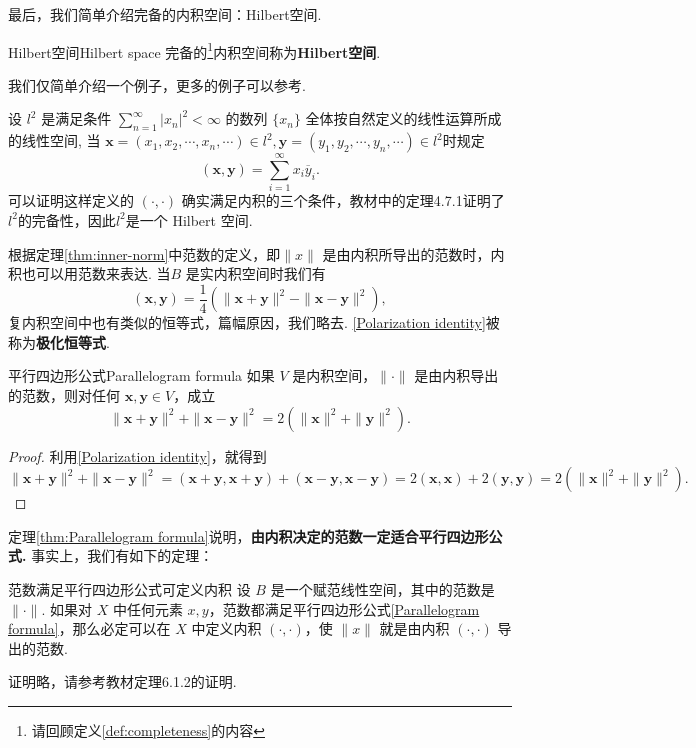 \documentclass[12pt, a4paper,newtx]{ctexart}
\begin{document}
最后，我们简单介绍完备的内积空间：Hilbert空间. 
\begin{definition}{Hilbert空间}{Hilbert space}
	完备的\footnote{请回顾定义\ref{def:completeness}的内容}内积空间称为\textbf{Hilbert空间}. 
\end{definition}
我们仅简单介绍一个例子，更多的例子可以参考\cite{5}. 
\begin{example}{}{}
	设 $l^2$ 是满足条件 $\displaystyle \sum_{n=1}^{\infty} |x_n|^2 < \infty$ 的数列 $\{x_n\}$ 全体按自然定义的线性运算所成的线性空间, 当
	$\bm x = (x_1, x_2, \cdots, x_n, \cdots) \in l^2, \bm y = (y_1, y_2, \cdots, y_n, \cdots) \in l^2$时规定
	\[
	(\bm x, \bm y) = \sum_{i=1}^{\infty} x_i \overline{y}_i.
	\]
	可以证明这样定义的 $(·,·)$ 确实满足内积的三个条件，教材\cite{5}中的定理4.7.1证明了$l^2$的完备性，因此$l^2$是一个 Hilbert 空间.
\end{example}
  根据定理\ref{thm:inner-norm}中范数的定义，即$\|x\|$ 是由内积所导出的范数时，内积也可以用范数来表达. 当$B$ 是实内积空间时我们有\begin{equation}\label{Polarization identity}
  	(\bm x, \bm y) = \frac{1}{4} (\|\bm x + \bm y\|^2 - \|\bm x - \bm y\|^2),
  \end{equation}
  复内积空间中也有类似的恒等式，篇幅原因，我们略去. \eqref{Polarization identity}被称为\textbf{极化恒等式}. 
\begin{theorem}{平行四边形公式}{Parallelogram formula}
	如果 $V$ 是内积空间，$\|\cdot\|$ 是由内积导出的范数，则对任何 $\bm x, \bm y \in V$，成立\begin{equation}\label{Parallelogram formula}
		\|\bm x + \bm y\|^2 + \|\bm x - \bm y\|^2 = 2(\|\bm x\|^2 + \|\bm y\|^2). 
	\end{equation}
\end{theorem}
\begin{proof}
	利用\eqref{Polarization identity}，就得到
	\[
	\|\bm x + \bm y\|^2 + \|\bm x -\bm y\|^2 = (\bm x +\bm y, \bm x + \bm y) + (\bm x - \bm y, \bm x - \bm y)
	= 2(\bm x, \bm x) + 2(\bm y,\bm y) = 2(\|\bm x\|^2 + \|\bm y\|^2).
	\]
\end{proof}
定理\ref{thm:Parallelogram formula}说明，\textbf{由内积决定的范数一定适合平行四边形公式. }事实上，我们有如下的定理：\begin{theorem}{范数满足平行四边形公式可定义内积}{}
	设 $B$ 是一个赋范线性空间，其中的范数是 $\|\cdot\|$. 如果对 $X$ 中任何元素 $x, y$，范数都满足平行四边形公式\eqref{Parallelogram formula}，那么必定可以在 $X$ 中定义内积 $(\cdot, \cdot)$，使 $\|x\|$ 就是由内积 $(\cdot, \cdot)$ 导出的范数.
\end{theorem}
证明略，请参考教材\cite{5}定理6.1.2的证明. 
\end{document}

